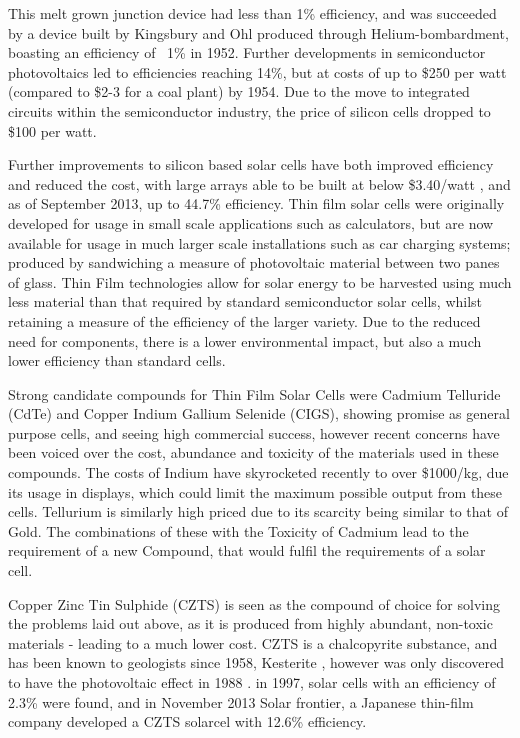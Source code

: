 This melt grown junction device had less than 1\% efficiency, and was succeeded by a device built by Kingsbury and Ohl produced through Helium-bombardment, boasting an efficiency of ~1\% in 1952. \citep{green_path_2009} Further developments in semiconductor photovoltaics led to efficiencies reaching 14\%, but at costs of up to \$250 per watt (compared to \$2-3 for a coal plant) by 1954. Due to the move to integrated circuits within the semiconductor industry, the price of silicon cells dropped to \$100 per watt.

Further improvements to silicon based solar cells have both improved efficiency and reduced the cost, with large arrays able to be built at below \$3.40/watt \citep{_solar_????}, and as of September 2013, up to 44.7\% efficiency. \citep{_solar_????-1} Thin film solar cells were originally developed for usage in small scale applications such as calculators, but are now available for usage in much larger scale installations such as car charging systems; produced by sandwiching a measure of photovoltaic material between two panes of glass. Thin Film technologies allow for solar energy to be harvested using much less material than that required by standard semiconductor solar cells, whilst retaining a measure of the efficiency of the larger variety. Due to the reduced need for components, there is a lower environmental impact, but also a much lower efficiency than standard cells.

Strong candidate compounds for Thin Film Solar Cells were Cadmium Telluride (CdTe) and Copper Indium Gallium Selenide (CIGS), showing promise as general purpose cells, and seeing high commercial success, however recent concerns have been voiced over the cost, abundance and toxicity of the materials used in these compounds. The costs of Indium have skyrocketed recently to over \$1000/kg, \citep{_slide_????}
due its usage in displays, which could limit the maximum possible output from these cells. Tellurium is similarly high priced due to its scarcity being similar to that of Gold. The combinations of these with the Toxicity of Cadmium lead to the requirement of a new Compound, that would fulfil the requirements of a solar cell.

Copper Zinc Tin Sulphide (CZTS) is seen as the compound of choice for solving the problems laid out above, as it is produced from highly abundant, non-toxic materials - leading to a much lower cost. \citep{wadia_materials_2009}
CZTS is a chalcopyrite substance, and has been known to geologists since 1958, Kesterite \citep{_kesterite_????}, however was only discovered to have the photovoltaic effect in 1988 \citep{ito_electrical_1988}. in 1997, solar cells with an efficiency of 2.3\% were found, and in November 2013 Solar frontier, a Japanese thin-film company developed a CZTS solarcel with 12.6\% efficiency. \citep{wang_device_2013}

